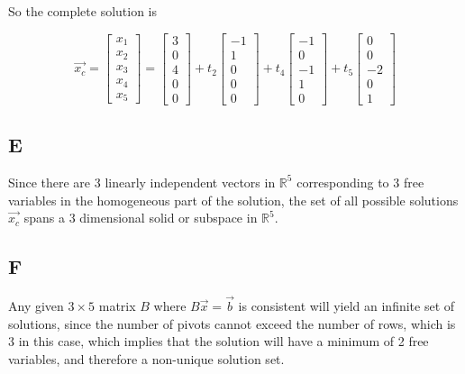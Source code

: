 \documentclass{report}
\begin{document}
So the complete solution is

\[
	\vec{x_c} =
	\begin{bmatrix}
		x_1 \\ x_2 \\ x_3 \\ x_4 \\ x_5
	\end{bmatrix}
	=
	\begin{bmatrix}
		3 \\0\\4\\0\\0
	\end{bmatrix}
	+ t_2
	\begin{bmatrix}
		-1 \\1\\0\\0\\0
	\end{bmatrix}
	+t_4
	\begin{bmatrix}
		-1 \\0\\-1\\1\\0
	\end{bmatrix}
	+t_5
	\begin{bmatrix}
		0 \\0\\-2\\0\\1
	\end{bmatrix}
\]

\subsection*{E}

Since there are 3 linearly independent vectors in $\mathbb{R}^5$ corresponding to 3 free variables in the homogeneous part of the solution, the set of all possible solutions $\vec{x_c}$ spans a 3 dimensional solid or subspace in \(\mathbb{R}^5\).

\subsection*{F}

Any given $3 \times 5 $ matrix $B$ where $B \vec{x} = \vec{b}$ is consistent will yield an infinite set of solutions, since the number of pivots cannot exceed the number of rows, which is 3 in this case, which implies that the solution will have a minimum of 2 free variables, and therefore a non-unique solution set.
\end{document}
